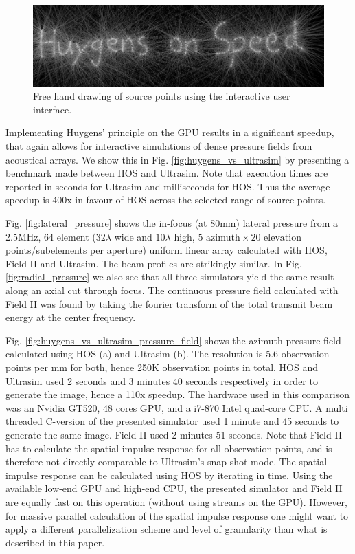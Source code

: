 \begin{figure}[!t]
\centering
\includegraphics[width=\textwidth]{img/freeHandDrawing2.png}
\caption{Free hand drawing of source points using the interactive user interface.}
\label{fig:huygens_free_hand}
\end{figure}

Implementing Huygens' principle on the GPU results in a significant speedup, that again allows for interactive simulations of dense pressure fields from acoustical arrays. We show this in Fig. \ref{fig:huygens_vs_ultrasim} by presenting a benchmark made between HOS and Ultrasim. Note that execution times are reported in seconds for Ultrasim and milliseconds for HOS. Thus the average speedup is 400x in favour of HOS across the selected range of source points. 

Fig. \ref{fig:lateral_pressure} shows the in-focus (at 80mm) lateral pressure from a 2.5MHz, 64 element ($32\lambda$ wide and $10\lambda$ high, $5 \text{ azimuth} \times 20 \text{ elevation}$ points/subelements per aperture) uniform linear array calculated with HOS, Field II and Ultrasim. The beam profiles are strikingly similar. In Fig. \ref{fig:radial_pressure} we also see that all three simulators yield the same result along an axial cut through focus. The continuous pressure field calculated with Field II was found by taking the fourier transform of the total transmit beam energy at the center frequency. 

Fig. \ref{fig:huygens_vs_ultrasim_pressure_field} shows the azimuth pressure field calculated using HOS (a) and Ultrasim (b). The resolution is 5.6 observation points per mm for both, hence 250K observation points in total. HOS and Ultrasim used 2 seconds and 3 minutes 40 seconds respectively in order to generate the image, hence a 110x speedup. The hardware used in this comparison was an Nvidia GT520, 48 cores GPU, and a i7-870 Intel quad-core CPU. A multi threaded C-version of the presented simulator used 1 minute and 45 seconds to generate the same image. Field II used 2 minutes 51 seconds. Note that Field II has to calculate the spatial impulse response for all observation points, and is therefore not directly comparable to Ultrasim's snap-shot-mode. The spatial impulse response can be calculated using HOS by iterating in time. Using the available low-end GPU and high-end CPU, the presented simulator and Field II are equally fast on this operation (without using streams on the GPU). However, for massive parallel calculation of the spatial impulse response one might want to apply a different parallelization scheme and level of granularity than what is described in this paper.

